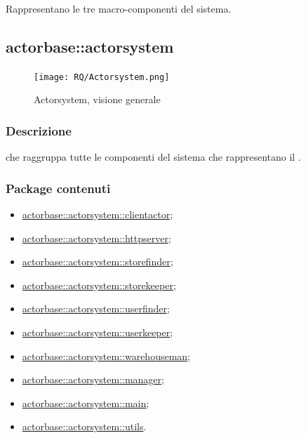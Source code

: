 \documentclass{scalatekids-article}
\begin{document}
Rappresentano le tre macro-componenti del sistema.


\subsection{actorbase::actorsystem} %
\label{sec:actorbase::actorsystem}

\begin{figure}[H]
  \begin{center}
    \texttt{[image: RQ/Actorsystem.png]}
    \caption{Actorsystem, visione generale}
  \end{center}
\end{figure}

\subsubsection{Descrizione}

 che raggruppa tutte le componenti del sistema che
rappresentano il .

\subsubsection{Package contenuti}

\begin{itemize}
\item \hyperref[sec:actorbase::actorsystem::clientactor]{actorbase::actorsystem::clientactor};
\item \hyperref[sec:actorbase::actorsystem::httpserver]{actorbase::actorsystem::httpserver};
\item \hyperref[sec:actorbase::actorsystem::storefinder]{actorbase::actorsystem::storefinder};
\item \hyperref[sec:actorbase::actorsystem::storekeeper]{actorbase::actorsystem::storekeeper};
\item \hyperref[sec:actorbase::actorsystem::userfinder]{actorbase::actorsystem::userfinder};
\item \hyperref[sec:actorbase::actorsystem::userkeeper]{actorbase::actorsystem::userkeeper};
\item \hyperref[sec:actorbase::actorsystem::warehouseman]{actorbase::actorsystem::warehouseman};
\item \hyperref[sec:actorbase::actorsystem::manager]{actorbase::actorsystem::manager};
\item \hyperref[sec:actorbase::actorsystem::main]{actorbase::actorsystem::main};
\item \hyperref[sec:actorbase::actorsystem::serialization]{actorbase::actorsystem::utils}.
\end{itemize}
\end{document}
